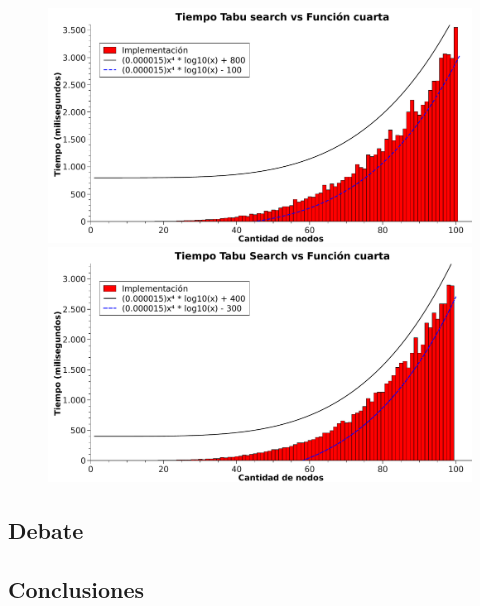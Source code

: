 \begin{figure}[htb]
\begin{minipage}{\textwidth}
\begin{center}
	\includegraphics[width=\textwidth]{./otros/graficos/tiempo_100nodos3_ej5.pdf}
	\caption{}
	\label{ej5tiempo3}
\end{center}
\end{minipage}

\begin{minipage}{\textwidth}
\begin{center}
	\includegraphics[width=\textwidth]{./otros/graficos/tiempo_100nodos4_ej5.pdf}
	\caption{}
	\label{ej5tiempo4}
\end{center}
\end{minipage}
\end{figure}

\subsection{Debate}


\subsection{Conclusiones}

